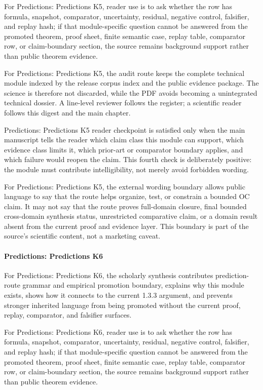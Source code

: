 For Predictions: Predictions K5, reader use is to ask whether the row has formula, snapshot, comparator, uncertainty, residual, negative control, falsifier, and replay hash; if that module-specific question cannot be answered from the promoted theorem, proof sheet, finite semantic case, replay table, comparator row, or claim-boundary section, the source remains background support rather than public theorem evidence.


For Predictions: Predictions K5, the audit route keeps the complete technical module indexed by the release corpus index and the public evidence package. The science is therefore not discarded, while the PDF avoids becoming a unintegrated technical dossier. A line-level reviewer follows the register; a scientific reader follows this digest and the main chapter.


Predictions: Predictions K5 reader checkpoint is satisfied only when the main manuscript tells the reader which claim class this module can support, which evidence class limits it, which prior-art or comparator boundary applies, and which failure would reopen the claim. This fourth check is deliberately positive: the module must contribute intelligibility, not merely avoid forbidden wording.


For Predictions: Predictions K5, the external wording boundary allows public language to say that the route helps organize, test, or constrain a bounded OC claim. It may not say that the route proves full-domain closure, final bounded cross-domain synthesis status, unrestricted comparative claim, or a domain result absent from the current proof and evidence layer. This boundary is part of the source's scientific content, not a marketing caveat.


\paragraph{Predictions: Predictions K6}

For Predictions: Predictions K6, the scholarly synthesis contributes prediction-route grammar and empirical promotion boundary, explains why this module exists, shows how it connects to the current 1.3.3 argument, and prevents stronger inherited language from being promoted without the current proof, replay, comparator, and falsifier surfaces.


For Predictions: Predictions K6, reader use is to ask whether the row has formula, snapshot, comparator, uncertainty, residual, negative control, falsifier, and replay hash; if that module-specific question cannot be answered from the promoted theorem, proof sheet, finite semantic case, replay table, comparator row, or claim-boundary section, the source remains background support rather than public theorem evidence.


